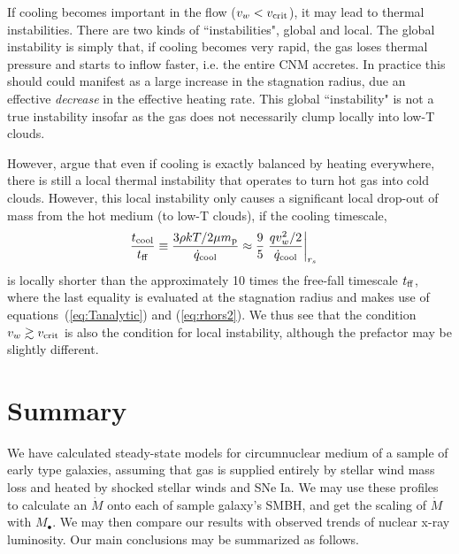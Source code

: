 \documentclass[usenatbib,fleqn]{mn2e}
\newcommand{\Mdot}{\dot{M}}
\newcommand{\rs}{r_s}
\newcommand{\vw}{v_w}
\renewcommand{\mp}{m_{\rm p}}
\newcommand{\Mbh}[1][]{M_{\bullet#1}}
\newcommand{\tcool}{t_{\rm cool}}
\newcommand{\tff}{t_{\rm ff}}
\begin{document}
If cooling becomes important in the flow ($v_{w} < v_{\rm crit}$), it may lead to thermal instabilities.  There are two kinds of ``instabilities", global and local.  The global instability is simply that, if cooling becomes very rapid, the gas loses thermal pressure and starts to inflow faster, i.e. the entire CNM accretes.  In
practice this should could manifest as a large increase in the stagnation radius, due an effective {\it decrease} in the effective heating rate.  This global ``instability" is not a true instability insofar as the gas does not necessarily clump locally into low-T clouds.

However, \citet{McCourt+12} argue that even if cooling is exactly balanced by heating everywhere, there is still a local thermal instability that operates to turn hot gas into cold clouds.  However, this local instability only causes a significant local drop-out of mass from the hot medium (to low-T clouds), if the cooling timescale,
\begin{align}
\frac{\tcool}{\tff} &\equiv \frac{3\rho k T/2 \mu \mp}{\dot{q}_{\rm cool}} \approx \frac{9}{5} \left. \frac{q \vw^2/2}{\dot{q}_{\rm cool}}\right|_{\rs}
\end{align} 
is locally shorter than the approximately 10 times the free-fall
timescale $t_{\rm ff}$, where the last equality is evaluated at the stagnation radius and makes use of equations~(\ref{eq:Tanalytic}) and (\ref{eq:rhors2}).  We thus see that the condition $v_w \gtrsim v_{\rm crit}$ is also the condition for local instability, although the prefactor may be slightly different.


  \section{Summary}
  \label{sec:summary}
  We have calculated steady-state models for circumnuclear medium of a
  sample of early type galaxies, assuming that gas is supplied
  entirely by stellar wind mass loss and heated by shocked stellar
  winds and SNe Ia. We may use these profiles to calculate an $\Mdot$
  onto each of sample galaxy's SMBH, and get the scaling of $\Mdot$
  with $\Mbh$. We may then compare our results with observed trends of
  nuclear x-ray luminosity. Our main conclusions may be summarized as
  follows.
\end{document}
